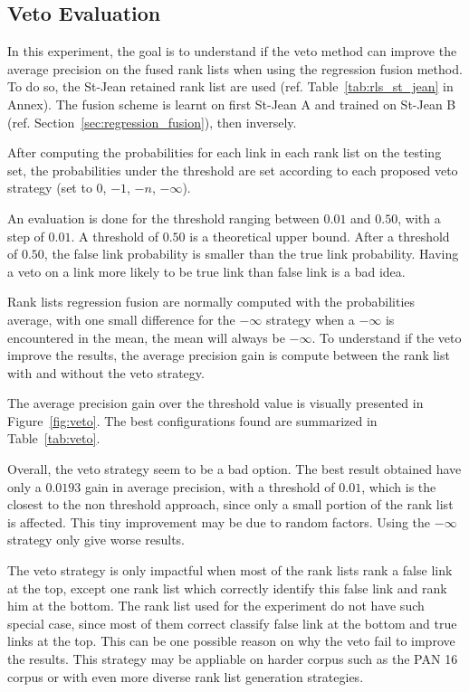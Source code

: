 \subsection{Veto Evaluation}

In this experiment, the goal is to understand if the veto method can improve the average precision on the fused rank lists when using the regression fusion method.
To do so, the St-Jean retained rank list are used (ref. Table~\ref{tab:rls_st_jean} in Annex).
The fusion scheme is learnt on first St-Jean A and trained on St-Jean B (ref. Section~\ref{sec:regression_fusion}), then inversely.

After computing the probabilities for each link in each rank list on the testing set, the probabilities under the threshold are set according to each proposed veto strategy (set to $0$, $-1$, $-n$, $-\infty$).

An evaluation is done for the threshold ranging between $0.01$ and $0.50$, with a step of $0.01$.
A threshold of $0.50$ is a theoretical upper bound.
After a threshold of $0.50$, the false link probability is smaller than the true link probability.
Having a veto on a link more likely to be true link than false link is a bad idea.

Rank lists regression fusion are normally computed with the probabilities average, with one small difference for the $-\infty$ strategy when a $-\infty$ is encountered in the mean, the mean will always be $-\infty$.
To understand if the veto improve the results, the average precision gain is compute between the rank list with and without the veto strategy.

The average precision gain over the threshold value is visually presented in Figure~\ref{fig:veto}.
The best configurations found are summarized in Table~\ref{tab:veto}.

Overall, the veto strategy seem to be a bad option.
The best result obtained have only a $0.0193$ gain in average precision, with a threshold of $0.01$, which is the closest to the non threshold approach, since only a small portion of the rank list is affected.
This tiny improvement may be due to random factors.
Using the $-\infty$ strategy only give worse results.

The veto strategy is only impactful when most of the rank lists rank a false link at the top, except one rank list which correctly identify this false link and rank him at the bottom.
The rank list used for the experiment do not have such special case, since most of them correct classify false link at the bottom and true links at the top.
This can be one possible reason on why the veto fail to improve the results.
This strategy may be appliable on harder corpus such as the PAN 16 corpus or with even more diverse rank list generation strategies.

